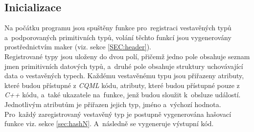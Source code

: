 \documentclass[11pt,twoside,a4paper]{book}
\begin{document}
\subsection{Inicializace}
Na počátku programu jsou spuštěny funkce pro~registraci vestavěných typů a~podporovaných primitivních typů, volání těchto funkcí jsou vygenerovány prostřednictvím maker (viz. sekce \ref{SEC:header}).\\
Registrované typy jsou uloženy do dvou polí, přičemž jedno pole obsahuje seznam jmen primitivních datových typů, a~druhé pole obsahuje struktury uchovávající data o vestavěných typech. Každému vestavěnému typu jsou přiřazeny atributy, které budou přístupné z \textit{CQML} kódu, atributy, které budou přístupné pouze z \textit{C++} kódu, a~také ukazatele na~funkce, jenž budou sloužit k~obsluze událostí. Jednotlivým atributům je přiřazen jejich typ, jméno a~výchozí hodnota. Pro~každý zaregistrovaný vestavěný typ je postupně vygenerována hašovací funkce viz. sekce \ref{sec:hashN}. A~následně se vygeneruje výstupní kód.\\
\end{document}
